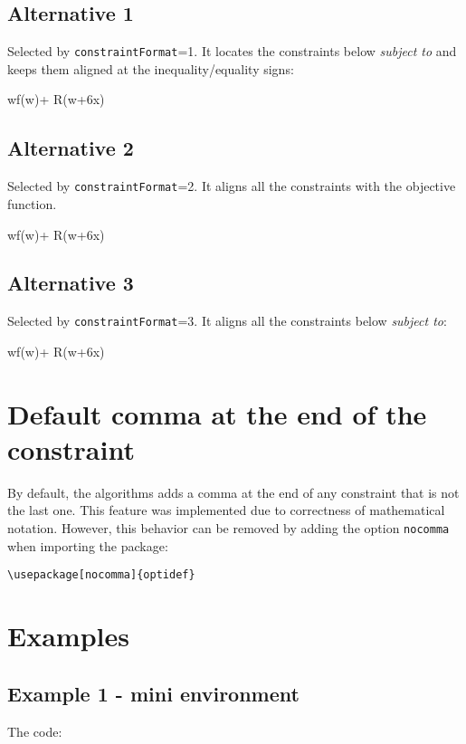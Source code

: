 \documentclass[a4paper]{article}
\begin{document}
\subsection{Alternative 1} 	
	Selected by \verb|constraintFormat|=1. It locates the constraints below \textit{subject to} and keeps them aligned at the inequality/equality signs:
 	\begin{mini}[1]
 		{w}{f(w)+ R(w+6x)}
 		{\label{eq:Ex1}}{}
 	\end{mini}
 \subsection{Alternative 2} 		
 	Selected by \verb|constraintFormat|=2. It aligns all the constraints with the objective function.
 	\begin{mini}[2]
 		{w}{f(w)+ R(w+6x)}
 		{\label{eq:Ex1}}{}
 	\end{mini} 	
 \subsection{Alternative 3} 		
 	Selected by \verb|constraintFormat|=3. It aligns all the constraints below \textit{subject to}:
 	\begin{mini}[3]
 		{w}{f(w)+ R(w+6x)}
 		{\label{eq:Ex1}}{}
 	\end{mini} 	

\section{Default comma at the end of the constraint}
\label{sec:comma}
By default, the algorithms adds a comma at the end of any constraint that is not the last one. This feature was implemented due to correctness of mathematical notation. However, this behavior can be removed by adding the option \verb|nocomma| when importing the package:

\begin{lstlisting}
\usepackage[nocomma]{optidef}
\end{lstlisting}

\section{Examples}
\subsection{Example 1 - mini environment}
The code:
\end{document}
